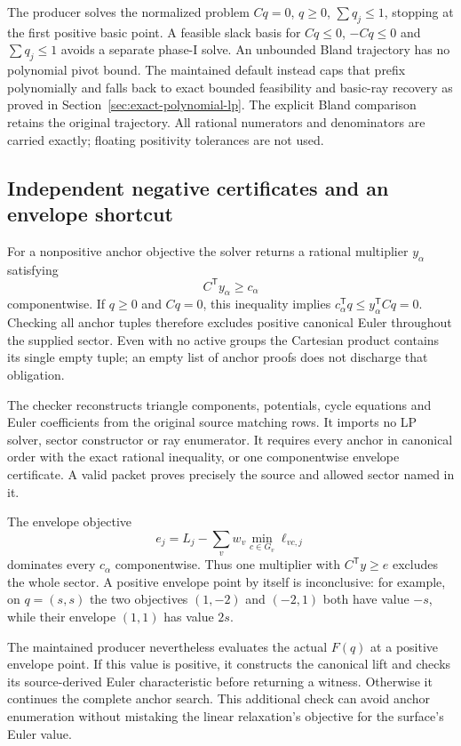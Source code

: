 The producer solves the normalized problem $Cq=0$, $q\geq0$,
$\sum q_j\leq1$, stopping at the first positive basic point.  A feasible
slack basis for $Cq\leq0$, $-Cq\leq0$ and $\sum q_j\leq1$ avoids a separate
phase-I solve.  An unbounded Bland trajectory has no polynomial pivot
bound.  The maintained default instead caps that prefix polynomially and
falls back to exact bounded feasibility and basic-ray recovery as proved
in Section~\ref{sec:exact-polynomial-lp}.  The explicit Bland comparison
retains the original trajectory.  All rational numerators and denominators
are carried exactly; floating positivity tolerances are not used.

\subsection{Independent negative certificates and an envelope shortcut}

For a nonpositive anchor objective the solver returns a rational multiplier
$y_\alpha$ satisfying
\[
 C^{\mathsf T}y_\alpha\geq c_\alpha
\]
componentwise.  If $q\geq0$ and $Cq=0$, this inequality implies
$c_\alpha^{\mathsf T}q\leq y_\alpha^{\mathsf T}Cq=0$.
Checking all anchor tuples therefore excludes positive canonical Euler
throughout the supplied sector.  Even with no active groups the Cartesian
product contains its single empty tuple; an empty list of anchor proofs
does not discharge that obligation.

The checker reconstructs triangle components, potentials, cycle equations
and Euler coefficients from the original source matching rows.  It imports
no LP solver, sector constructor or ray enumerator.  It requires every
anchor in canonical order with the exact rational inequality, or one
componentwise envelope certificate.  A valid packet proves precisely the
source and allowed sector named in it.

The envelope objective
\[
 e_j=L_j-\sum_v w_v\min_{c\in G_v}\ell_{vc,j}
\]
dominates every $c_\alpha$ componentwise.  Thus one multiplier with
$C^{\mathsf T}y\geq e$ excludes the whole sector.  A positive envelope
point by itself is inconclusive: for example, on $q=(s,s)$ the two
objectives $(1,-2)$ and $(-2,1)$ both have value $-s$, while their envelope
$(1,1)$ has value $2s$.

The maintained producer nevertheless evaluates the actual $F(q)$ at a
positive envelope point.  If this value is positive, it constructs the
canonical lift and checks its source-derived Euler characteristic before
returning a witness.  Otherwise it continues the complete anchor search.
This additional check can avoid anchor enumeration without mistaking the
linear relaxation's objective for the surface's Euler value.


